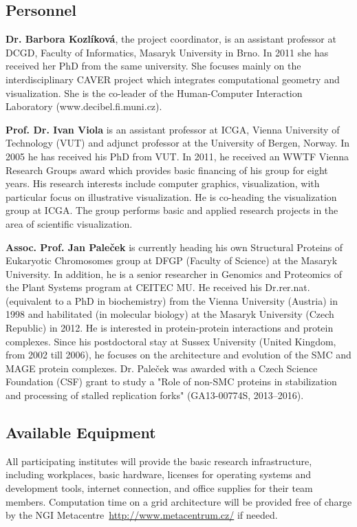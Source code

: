 \documentclass[11pt,a4paper,titlepage,oneside,onecolumn]{article}
\begin{document}
\subsection{Personnel}

\textbf{Dr. Barbora Kozl\'{i}kov\'{a}}, the project coordinator, is an assistant professor at DCGD, Faculty of Informatics, Masaryk University in Brno. In 2011 she has received her PhD from the same university. She focuses mainly on the interdisciplinary CAVER project which integrates computational geometry and visualization. She is the co-leader of the Human-Computer Interaction Laboratory (www.decibel.fi.muni.cz). 

\textbf{Prof. Dr. Ivan Viola} is an assistant professor at ICGA, Vienna University of Technology (VUT) and adjunct professor at the University of Bergen, Norway. In 2005 he has received his PhD from VUT. In 2011, he received an WWTF Vienna Research Groups award which provides basic financing of his group for eight years. His research interests include computer graphics, visualization, with particular focus on illustrative visualization. He is co-heading the visualization group at ICGA. The group performs basic and applied research projects in the area of scientific visualization. 

\textbf{Assoc. Prof. Jan Pale\v{c}ek} is currently heading his own Structural Proteins of Eukaryotic Chromosomes group at  DFGP (Faculty of Science) at the Masaryk University. 
In addition, he is a senior researcher in Genomics and Proteomics of the Plant Systems program at CEITEC MU. 
He received his Dr.rer.nat. (equivalent to a PhD in biochemistry) from the Vienna University (Austria) in 1998 and habilitated (in molecular biology) at the Masaryk University (Czech Republic) in 2012. 
He is interested in protein-protein interactions and protein complexes. 
Since his postdoctoral stay at Sussex University (United Kingdom, from 2002 till 2006), he focuses on the architecture and evolution of the SMC and MAGE protein complexes. 
Dr. Pale\v{c}ek was awarded with a Czech Science Foundation (CSF) grant to study a "Role of non-SMC proteins in stabilization and processing of stalled replication forks" (GA13-00774S, 2013--2016).


\subsection{Available Equipment}
\label{subsec:AvailableEquipment}
All participating institutes will provide the basic research infrastructure, including workplaces, basic hardware, licenses for operating systems and development tools, internet connection, and office supplies for their team members. 
Computation time on a grid architecture will be provided free of charge by the NGI Metacentre~\url{http://www.metacentrum.cz/} if needed. 
\end{document}
